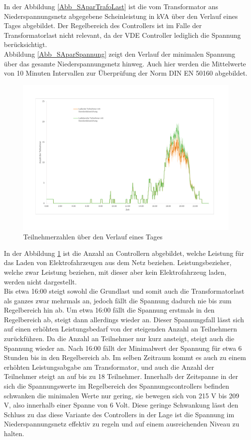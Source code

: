 In der Abbildung \ref{Abb_SAparTrafoLast} ist die vom Transformator ans Niederspannungsnetz abgegebene Scheinleistung in kVA über den Verlauf eines Tages abgebildet. Der Regelbereich des Controllers ist im Falle der Transformatorlast nicht relevant, da der VDE Controller lediglich die Spannung berücksichtigt.\\
Abbildung \ref{Abb_SAparSpannung} zeigt den Verlauf der minimalen Spannung über das gesamte Niederspannungsnetz hinweg. Auch hier werden die Mittelwerte von 10 Minuten Intervallen zur Überprüfung der Norm DIN EN 50160 abgebildet.
\begin{figure}[htb]
\centering
	\includegraphics[scale=0.5]{img/SA_par/Teilnehmer_full.pdf}
	\caption{Teilnehmerzahlen über den Verlauf eines Tages}
	\label{Abb_SAparTeilnehmer}
\end{figure}
In der Abbildung \ref{Abb_SAparTeilnehmer} ist die Anzahl an Controllern abgebildet, welche Leistung für das Laden von Elektrofahrzeugen aus dem Netz beziehen. Leistungsbezieher, welche zwar Leistung beziehen, mit dieser aber kein Elektrofahrzeug laden, werden nicht dargestellt. \\
Bis etwa 16:00 steigt sowohl die Grundlast und somit auch die Transformatorlast als ganzes zwar mehrmals an, jedoch fällt die Spannung dadurch nie bis zum Regelbereich hin ab. Um etwa 16:00 fällt die Spannung erstmals in den Regelbereich ab, steigt dann allerdings wieder an. Dieser Spannungsfall lässt sich auf einen erhöhten Leistungsbedarf von der steigenden Anzahl an Teilnehmern zurückführen. Da die Anzahl an Teilnehmer nur kurz ansteigt, steigt auch die Spannung wieder an. Nach 16:00 fällt der Minimalwert der Spannung für etwa 6 Stunden bis in den Regelbereich ab. Im selben Zeitraum kommt es auch zu einem erhöhten Leistungsabgabe am Transformator, und auch die Anzahl der Teilnehmer steigt an auf bis zu 18 Teilnehmer. Innerhalb der Zeitspanne in der sich die Spannungswerte im Regelbereich des Spannungscontrollers befinden schwanken die minimalen Werte nur gering, sie bewegen sich von 215 V bis 209 V, also innerhalb einer Spanne von 6 Volt. Diese geringe Schwankung lässt den Schluss zu das diese Variante des Controllers in der Lage ist die Spannung im Niederspannungsnetz effektiv zu regeln und auf einem ausreichenden Niveau zu halten. \\
